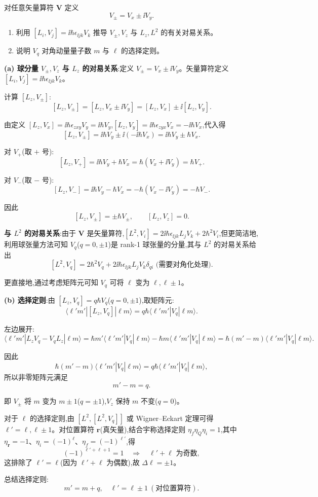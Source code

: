 \begin{question}
对任意矢量算符 $\mathbf V$ 定义
\[
V_\pm=V_x\pm\ii V_y.
\]
\begin{enumerate}
\item 利用 $[L_i,V_j]=\ii\hbar\epsilon_{\ii jk}V_k$ 推导 $V_\pm,V_z$ 与 $L_z,L^2$ 的有关对易关系。
\item 说明 $V_q$ 对角动量量子数 $m$ 与 $\ell$ 的选择定则。
\end{enumerate}
\end{question}
\begin{solution}
	\textbf{(a) 球分量 $V_\pm,V_z$ 与 $L_z$ 的对易关系}:定义 $V_\pm = V_x \pm \ii V_y$。矢量算符定义 $[L_i,V_j]=\ii\hbar\epsilon_{\ii jk}V_k$。

	计算 $[L_z,V_\pm]$:
	\[
	[L_z,V_\pm] = [L_z,V_x\pm\ii V_y] = [L_z,V_x]\pm\ii[L_z,V_y].
	\]

	由定义 $[L_z,V_x]=\ii\hbar\epsilon_{zxy}V_y = \ii\hbar V_y$,$[L_z,V_y]=\ii\hbar\epsilon_{zyx}V_x = -\ii\hbar V_x$,代入得
	\[
	[L_z,V_\pm] = \ii\hbar V_y \pm \ii(-\ii\hbar V_x) = \ii\hbar V_y \pm \hbar V_x.
	\]

	对 $V_+$(取 $+$ 号):
	\[
	[L_z,V_+] = \ii\hbar V_y + \hbar V_x = \hbar(V_x+\ii V_y) = \hbar V_+.
	\]

	对 $V_-$(取 $-$ 号):
	\[
	[L_z,V_-] = \ii\hbar V_y - \hbar V_x = -\hbar(V_x-\ii V_y) = -\hbar V_-.
	\]

	因此
	\[
	[L_z,V_\pm] = \pm\hbar V_\pm,\qquad [L_z,V_z]=0.
	\]

	\textbf{与 $L^2$ 的对易关系}:由于 $\mathbf V$ 是矢量算符,$[L^2,V_i]=2\ii\hbar\epsilon_{\ii jk}L_jV_k + 2\hbar^2 V_i$,但更简洁地,利用球张量方法可知 $V_q$($q=0,\pm1$)是 rank-1 球张量的分量,其与 $L^2$ 的对易关系给出
	\[
	[L^2,V_q] = 2\hbar^2 V_q + 2\ii\hbar\epsilon_{\ii jk}L_jV_k\delta_{qi} \text{ (需要对角化处理)}.
	\]

	更直接地,通过考虑矩阵元可知 $V_q$ 可将 $\ell$ 变为 $\ell,\ell\pm1$。

	\textbf{(b) 选择定则}:由 $[L_z,V_q]=q\hbar V_q$($q=0,\pm1$),取矩阵元:
	\[
	\langle \ell'm'|[L_z,V_q]|\ell m\rangle = q\hbar\langle \ell'm'|V_q|\ell m\rangle.
	\]

	左边展开:
	\[
	\langle \ell'm'|L_zV_q - V_qL_z|\ell m\rangle
	= \hbar m'\langle \ell'm'|V_q|\ell m\rangle - \hbar m\langle \ell'm'|V_q|\ell m\rangle
	= \hbar(m'-m)\langle \ell'm'|V_q|\ell m\rangle.
	\]

	因此
	\[
	\hbar(m'-m)\langle \ell'm'|V_q|\ell m\rangle = q\hbar\langle \ell'm'|V_q|\ell m\rangle,
	\]
	所以非零矩阵元满足
	\[
	m' - m = q.
	\]

	\noindent 即 $V_\pm$ 将 $m$ 变为 $m\pm1$($q=\pm1$),$V_z$ 保持 $m$ 不变($q=0$)。

	对于 $\ell$ 的选择定则,由 $[L^2,[L^2,V_q]]$ 或 Wigner--Eckart 定理可得 $\ell' = \ell,\ell\pm1$。对位置算符 $\mathbf r$(真矢量),结合宇称选择定则 $\eta_f\eta_Q\eta_i=1$,其中 $\eta_\mathbf r=-1$、$\eta_i=(-1)^\ell$、$\eta_f=(-1)^{\ell'}$,得
	\[
	(-1)^{\ell'+\ell+1}=1 \quad\Longrightarrow\quad \ell'+\ell \text{ 为奇数},
	\]
	这排除了 $\ell'=\ell$(因为 $\ell'+\ell$ 为偶数),故 $\Delta\ell = \pm1$。

	总结选择定则:
	\[
	\boxed{m' = m+q,\quad \ell' = \ell\pm1\ (\text{对位置算符})}.
	\]
	\end{solution}


